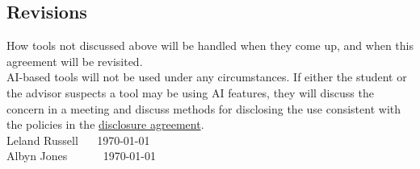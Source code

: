\documentclass[12pt]{amsart}
\begin{document}
\subsection*{Revisions} How tools not discussed above will be handled when they come up, and when this agreement will be revisited. \\

AI-based tools will not be used under any circumstances. If either the student or the advisor suspects a tool may be using AI features, they will discuss the concern in a meeting and discuss methods for disclosing the use consistent with the policies in the \hyperref[sbsec: disclosure]{disclosure agreement}. \\

\noindent Leland Russell \ \  \underline{\hspace{0.4\linewidth}} \hfill \today\\

\noindent Albyn Jones \ \ \ \ \  \underline{\hspace{0.4\linewidth}} \hfill \today\\
\end{document}

